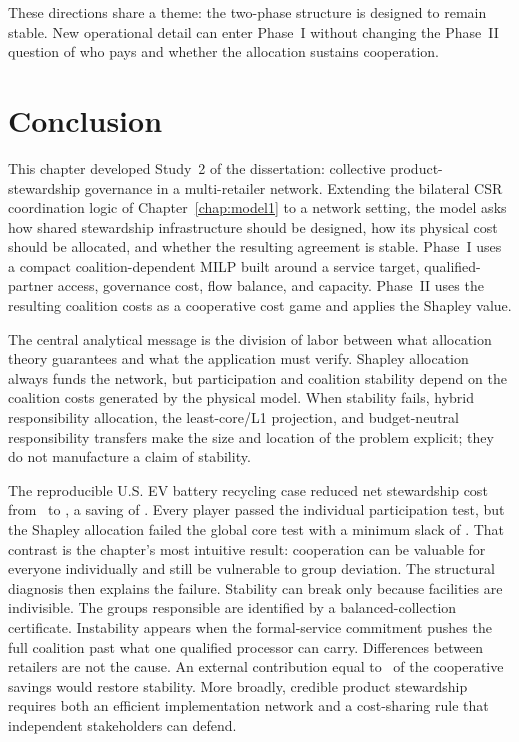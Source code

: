 These directions share a theme: the two-phase structure is designed to remain stable. New operational detail can enter Phase~I without changing the Phase~II question of who pays and whether the allocation sustains cooperation.

\section{Conclusion}
\label{sec:model_conclusion}

This chapter developed Study~2 of the dissertation: collective product-stewardship governance in a multi-retailer network. Extending the bilateral CSR coordination logic of Chapter~\ref{chap:model1} to a network setting, the model asks how shared stewardship infrastructure should be designed, how its physical cost should be allocated, and whether the resulting agreement is stable. Phase~I uses a compact coalition-dependent MILP built around a service target, qualified-partner access, governance cost, flow balance, and capacity. Phase~II uses the resulting coalition costs as a cooperative cost game and applies the Shapley value.

The central analytical message is the division of labor between what allocation theory guarantees and what the application must verify. Shapley allocation always funds the network, but participation and coalition stability depend on the coalition costs generated by the physical model. When stability fails, hybrid responsibility allocation, the least-core/L1 projection, and budget-neutral responsibility transfers make the size and location of the problem explicit; they do not manufacture a claim of stability.

The reproducible U.S. EV battery recycling case reduced net stewardship cost from \ChFourStandaloneTotal\ to \ChFourGrandCost, a saving of \ChFourSavingsPercent. Every player passed the individual participation test, but the Shapley allocation failed the global core test with a minimum slack of \ChFourMinSlack. That contrast is the chapter's most intuitive result: cooperation can be valuable for everyone individually and still be vulnerable to group deviation. The structural diagnosis then explains the failure. Stability can break only because facilities are indivisible. The groups responsible are identified by a balanced-collection certificate. Instability appears when the formal-service commitment pushes the full coalition past what one qualified processor can carry. Differences between retailers are not the cause. An external contribution equal to \ChFourCoSShareSavings\ of the cooperative savings would restore stability. More broadly, credible product stewardship requires both an efficient implementation network and a cost-sharing rule that independent stakeholders can defend.
